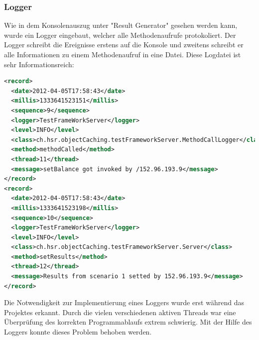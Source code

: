 \subsubsection{Logger}
\label{sec:logger}
Wie in dem Konsolenauszug unter "Result Generator" gesehen werden kann, wurde ein Logger eingebaut, welcher alle Methodenaufrufe protokoliert. Der Logger schreibt die Ereignisse erstens auf die Konsole und zweitens schreibt er alle Informationen zu einem Methodenaufruf in eine Datei. Diese Logdatei ist sehr Informationsreich:

\begin{lstlisting}[language=XML, breaklines=true]
<record>
  <date>2012-04-05T17:58:43</date>
  <millis>1333641523151</millis>
  <sequence>9</sequence>
  <logger>TestFrameWorkServer</logger>
  <level>INFO</level>
  <class>ch.hsr.objectCaching.testFrameworkServer.MethodCallLogger</class>
  <method>methodCalled</method>
  <thread>11</thread>
  <message>setBalance got invoked by /152.96.193.9</message>
</record>
<record>
  <date>2012-04-05T17:58:43</date>
  <millis>1333641523198</millis>
  <sequence>10</sequence>
  <logger>TestFrameWorkServer</logger>
  <level>INFO</level>
  <class>ch.hsr.objectCaching.testFrameworkServer.Server</class>
  <method>setResults</method>
  <thread>12</thread>
  <message>Results from scenario 1 setted by 152.96.193.9</message>
</record>
\end{lstlisting}

Die Notwendigkeit zur Im\-pl\-emen\-tie\-rung eines Log\-gers wurde erst wäh\-rend das Projektes erkannt. Durch die vielen verschiedenen aktiven Threads war eine Überprüfung des korrekten Programmablaufs extrem schwierig. Mit der Hilfe des Loggers konnte dieses Problem behoben werden.

